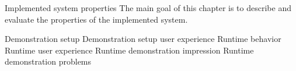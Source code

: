 \chap Implemented system properties
The main goal of this chapter is to describe and evaluate the properties of the implemented system.

\sec Demonstration setup
\sec Demonstration setup user experience
\sec Runtime behavior
\sec Runtime user experience
\sec Runtime demonstration impression
\sec Runtime demonstration problems